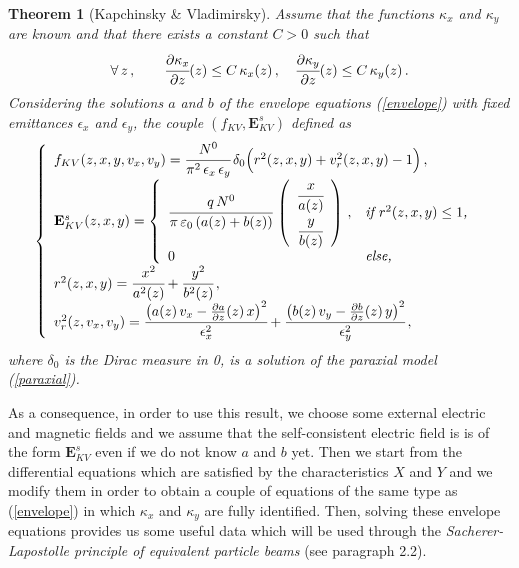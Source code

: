 \documentclass[10pt]{article}
\newcommand{\D}{{\partial}}
\newtheorem{theorem}{Theorem}
\begin{document}
\begin{theorem}[Kapchinsky \& Vladimirsky]
Assume that the functions $\kappa_{x}$ and $\kappa_{y}$ are known and that there exists a constant $C > 0$ such that
\begin{equation}
\forall\, z \, , \qquad \cfrac{\D \kappa_{x}}{\D z}(z) \leq C \, \kappa_{x}(z) \, , \quad \cfrac{\D \kappa_{y}}{\D z}(z) \leq C \, \kappa_{y}(z) \, .
\end{equation}
Considering the solutions $a$ and $b$ of the envelope equations (\ref{envelope}) with fixed emittances $\epsilon_{x}$ and $\epsilon_{y}$, the couple $(f_{KV},\mathbf{E}_{KV}^{s})$ defined as
\begin{equation} \label{def_KV}
\left\{
\begin{array}{l}
f_{KV}(z,x,y,v_{x},v_{y}) = \cfrac{N^{0}}{\pi^{2}\,\epsilon_{x}\,\epsilon_{y}} \, \delta_{0}\Big( r^{2}(z,x,y) + v_{r}^{2}(z,x,y) - 1\Big) \, , \\
\mathbf{E}_{KV}^{s}(z,x,y) = \left\{
\begin{array}{ll}
\cfrac{q\,N^{0}}{\pi\,\varepsilon_{0}\,(a(z)+b(z))}\, \left(
\begin{array}{c}
\cfrac{x}{a(z)} \\ \cfrac{y}{b(z)}
\end{array}
\right) \, , & \textit{if $r^{2}(z,x,y) \leq 1$,} \\
0 & \textit{else,}
\end{array}
\right. \\
r^{2}(z,x,y) = \cfrac{x^{2}}{a^{2}(z)} + \cfrac{y^{2}}{b^{2}(z)} \, , \\
v_{r}^{2}(z,v_{x},v_{y}) = \cfrac{\big(a(z)\,v_{x} - \frac{\D a}{\D z}(z) \, x\big)^{2}}{\epsilon_{x}^{2}} + \cfrac{\big(b(z)\,v_{y} - \frac{\D b}{\D z}(z) \, y\big)^{2}}{\epsilon_{y}^{2}} \, ,
\end{array}
\right.
\end{equation}
where $\delta_{0}$ is the Dirac measure in 0, is a solution of the paraxial model (\ref{paraxial}).
\end{theorem}

As a consequence, in order to use this result, we choose some external electric and magnetic fields and we assume that the self-consistent electric field is is of the form $\mathbf{E}_{KV}^{s}$ even if we do not know $a$ and $b$ yet. Then we start from the differential equations which are satisfied by the characteristics $X$ and $Y$ and we modify them in order to obtain a couple of equations of the same type as (\ref{envelope}) in which $\kappa_{x}$ and $\kappa_{y}$ are fully identified. Then, solving these envelope equations provides us some useful data which will be used through the \textit{Sacherer-Lapostolle principle of equivalent particle beams} (see paragraph 2.2).
\end{document}
